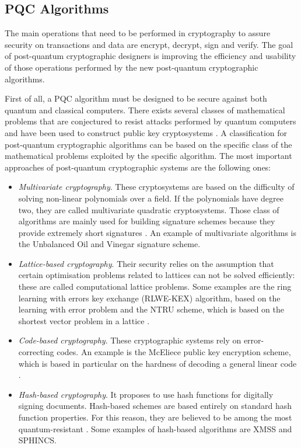 \documentclass[a4paper,12pt]{article}
\begin{document}
\subsection{PQC Algorithms}
\label{sub:pqcalgo}

The main operations that need to be performed in cryptography to assure security on transactions and data are encrypt, decrypt, sign and verify. The goal of post-quantum cryptographic designers is improving the efficiency and usability of those operations performed by the new post-quantum cryptographic algorithms.

First of all, a PQC algorithm must be designed to be secure against both quantum and classical computers.
There exists several classes of mathematical problems that are conjectured to resist attacks performed by quantum computers and have been used to construct public key cryptosystems \cite{10_postquantum_keyexchange}. A classification for post-quantum cryptographic algorithms can be based on the specific class of the mathematical problems exploited by the specific algorithm. The most important approaches of post-quantum cryptographic systems are the following ones:

\begin{itemize}
    \item \textit{Multivariate cryptography}. These cryptosystems are based on the difficulty of solving non-linear polynomials over a field. If the polynomials have degree two, they are called multivariate quadratic cryptosystems. Those class of algorithms are mainly used for building signature schemes because they provide extremely short signatures \cite{1_sphincspaper}. An example of multivariate algorithms is the Unbalanced Oil and Vinegar signature scheme.
    \item \textit{Lattice-based cryptography}. Their security relies on the assumption that certain optimisation problems related to lattices can not be solved efficiently: these are called computational lattice problems. Some examples are the ring learning with errors key exchange (RLWE-KEX) algorithm, based on the learning with error problem and the NTRU scheme, which is based on the shortest vector problem in a lattice \cite{10_postquantum_keyexchange}.
    \item \textit{Code-based cryptography}. These cryptographic systems rely on error-correcting codes. An example is the McEliece public key encryption scheme, which is based in particular on the hardness of decoding a general linear code \cite{10_postquantum_keyexchange}.
	\item \textit{Hash-based cryptography}. It proposes to use hash functions for digitally signing documents. Hash-based schemes are based entirely on standard hash function properties. For this reason, they are believed to be among the most quantum-resistant \cite{10_postquantum_keyexchange}. Some examples of hash-based algorithms are XMSS and SPHINCS.
\end{itemize}
\end{document}
